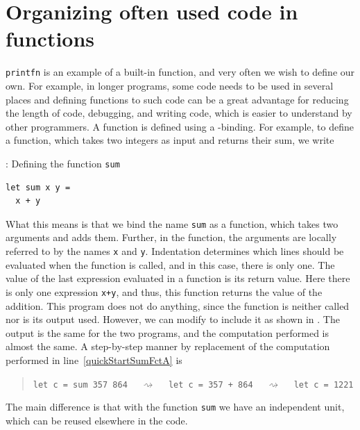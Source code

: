 \documentclass[fsharpNotes.tex]{subfiles}
\begin{document}
\section{Organizing often used code in functions}
\lstinline{printfn} is an example of a built-in function, and very often we wish to define our own. For example, in longer programs, some code needs to be used in several places and defining functions to  such code can be a great advantage for reducing the length of code, debugging, and writing code, which is easier to understand by other programmers. A function is defined using a -binding. For example, to define a function, which takes two integers as input and returns their sum, we write
%
\begin{codeNOutput}[label=sumFunction,
  top=-5pt,
  bottom=-5pt,
  left=-2pt,
  right=-2pt,
]{: Defining the function \lstinline{sum}}
\begin{lstlisting}
let sum x y =
  x + y
\end{lstlisting} 
\end{codeNOutput}
%
What this means is that we bind the name \lstinline{sum} as a function, which takes two arguments and adds them. Further, in the function, the arguments are locally referred to by the names \lstinline{x} and \lstinline{y}. Indentation determines which lines should be evaluated when the function is called, and in this case, there is only one. The value of the last expression evaluated in a function is its return value. Here there is only one expression \lstinline{x+y}, and thus, this function returns the value of the addition. This program does not do anything, since the function is neither called nor is its output used. However, we can modify  to include it as shown in .
% 
%
The output is the same for the two programs, and the computation performed is almost the same. A step-by-step manner by replacement of the computation performed in line~\ref{quickStartSumFctA} is
\begin{quote}
  \lstinline{let c = sum 357 864} $\quad\rightsquigarrow\quad$  \lstinline{let c = 357 + 864}  $\quad\rightsquigarrow\quad$  \lstinline{let c = 1221}
\end{quote}
The main difference is that with the function \lstinline{sum} we have an independent unit, which can be reused elsewhere in the code.
\end{document}
